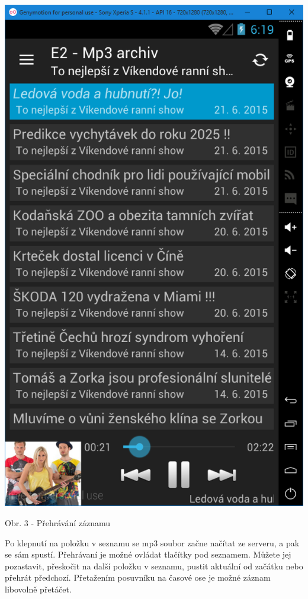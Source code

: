 \documentclass[12pt,a4paper,titlepage]{article}
\begin{document}
{	\begin{center}
		\includegraphics[scale=0.5]{archiv3.png}	
	\end{center}
	\begin{center}
		\footnotesize Obr. 3 - Přehrávání záznamu	
	\end{center}
	
	Po klepnutí na položku v seznamu se mp3 soubor začne načítat ze serveru, a pak se sám spustí. Přehrávaní je možné ovládat tlačítky pod seznamem. Můžete jej pozastavit, přeskočit na další položku v seznamu, pustit aktuální od začátku nebo přehrát předchozí. Přetažením posuvníku na časové ose je možné záznam libovolně přetáčet.
	
}
\end{document}
